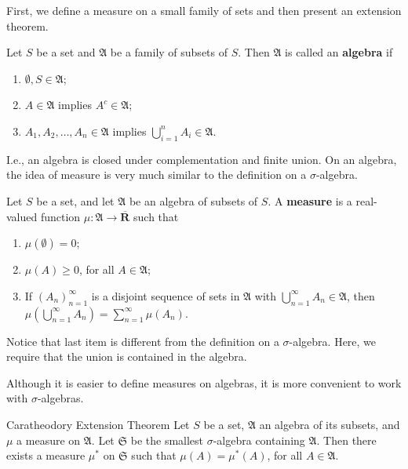 First, we define a measure on a small family of sets and then present an extension theorem.

\begin{definition}[]{}{}
	Let $S$ be a set and $\mathfrak{A}$ be a family of subsets of $S$. Then $\mathfrak{A}$ is called an \textbf{algebra} if 
	\begin{enumerate}
		\item $\emptyset, S \in \mathfrak{A}$;
		\item $A \in \mathfrak{A}$ implies $A^c \in \mathfrak{A}$;
		\item $A_1, A_2, \ldots, A_n \in \mathfrak{A}$ implies $\bigcup_{i=1}^n A_i \in \mathfrak{A}$.
	\end{enumerate}
\end{definition}

I.e., an algebra is closed under complementation and finite union. On an algebra, the idea of measure is very much similar to the definition on a $\sigma$-algebra.

\begin{definition}[]{}{}
	Let $S$ be a set, and let $\mathfrak{A}$ be an algebra of subsets of $S$. A \textbf{measure} is a real-valued function $\mu : \mathfrak{A} \longrightarrow \overline{\textbf{R}}$ such that 
	\begin{enumerate}
		\item $\mu ( \emptyset ) = 0$;
		\item $\mu(A) \geq 0$, for all $A \in \mathfrak{A}$;
		\item If $(A_n)_{n=1}^\infty$ is a disjoint sequence of sets in $\mathfrak{A}$ with $\bigcup_{n=1}^\infty A_n \in \mathfrak{A}$, then $\mu \left( \bigcup_{n=1}^\infty A_n \right) = \sum_{n=1}^\infty \mu(A_n)$.
	\end{enumerate}
\end{definition}

Notice that last item is different from the definition on a $\sigma$-algebra. Here, we require that the union is contained in the algebra.

Although it is easier to define measures on algebras, it is more convenient to work with $\sigma$-algebras.

\begin{theorem}[]{Caratheodory Extension Theorem}{}\label{thm:caratheodory}
	Let $S$ be a set, $\mathfrak{A}$ an algebra of its subsets, and $\mu$ a measure on $\mathfrak{A}$. Let $\mathfrak{S}$ be the smallest $\sigma$-algebra containing $\mathfrak{A}$. Then there exists a measure $\mu^{\ast}$ on $\mathfrak{S}$ such that $\mu(A) = \mu^{\ast}(A)$, for all $A \in \mathfrak{A}$.
\end{theorem}

